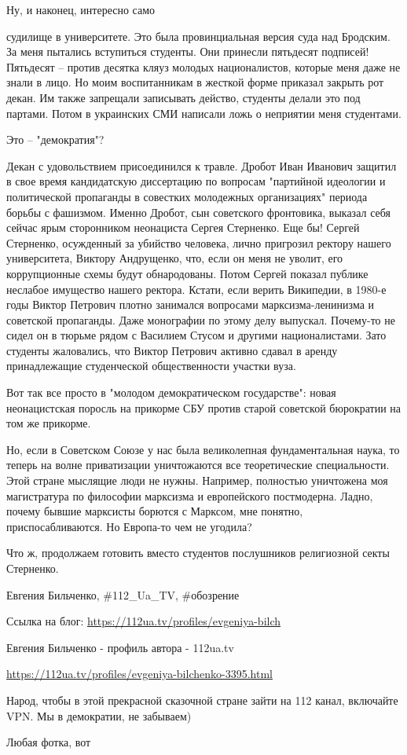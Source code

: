 Ну, и наконец, интересно само

судилище в университете. Это была провинциальная версия суда над Бродским. За
меня пытались вступиться студенты. Они принесли пятьдесят подписей! Пятьдесят –
против десятка кляуз молодых националистов, которые меня даже не знали в лицо.
Но моим воспитанникам в жесткой форме приказал закрыть рот декан. Им также
запрещали записывать действо, студенты делали это под партами. Потом в
украинских СМИ написали ложь о неприятии меня студентами.

Это – "демократия"?

Декан с удовольствием присоединился к травле. Дробот Иван Иванович защитил в
свое время кандидатскую диссертацию по вопросам "партийной идеологии и
политической пропаганды в совестких молодежных организациях" периода борьбы с
фашизмом. Именно Дробот, сын советского фронтовика, выказал себя сейчас ярым
сторонником неонациста Сергея Стерненко. Еще бы! Сергей Стерненко, осужденный
за убийство человека, лично пригрозил ректору нашего университета, Виктору
Андрущенко, что, если он меня не уволит, его коррупционные схемы будут
обнародованы. Потом Сергей показал публике неслабое имущество нашего ректора.
Кстати, если верить Википедии, в 1980-е годы Виктор Петрович плотно занимался
вопросами марксизма-ленинизма и советской пропаганды. Даже монографии по этому
делу выпускал. Почему-то не сидел он в тюрьме рядом с Василием Стусом и другими
националистами. Зато студенты жаловались, что Виктор Петрович активно сдавал в
аренду принадлежащие студенческой общественности участки вуза.

Вот так все просто в "молодом демократическом государстве": новая неонацистская
поросль на прикорме СБУ против старой советской бюрократии на том же прикорме.

Но, если в Советском Союзе у нас была великолепная фундаментальная наука, то
теперь на волне приватизации уничтожаются все теоретические специальности. Этой
стране мыслящие люди не нужны. Например, полностью уничтожена моя магистратура
по философии марксизма и европейского постмодерна. Ладно, почему бывшие
марксисты борются с Марксом, мне понятно, приспосабливаются. Но Европа-то чем
не угодила?

Что ж, продолжаем готовить вместо студентов послушников религиозной секты
Стерненко.

Евгения Бильченко, \#112\_Ua\_TV, \#обозрение

Ссылка на блог: 
\url{https://112ua.tv/profiles/evgeniya-bilch}

Евгения Бильченко - профиль автора - 112ua.tv

\url{https://112ua.tv/profiles/evgeniya-bilchenko-3395.html}

Народ, чтобы в этой прекрасной сказочной стране зайти на 112 канал, включайте
VPN. Мы в демократии, не забываем)

Любая фотка, вот

